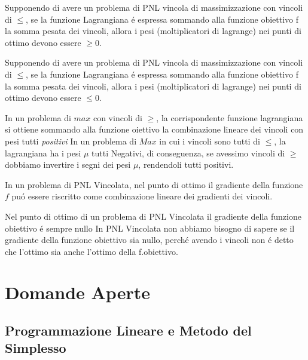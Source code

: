 \documentclass[12pt, a4paper, openany]{book}
\begin{document}
\affermazionetrue
{Supponendo di avere un problema di PNL vincola di massimizzazione con vincoli di $\leq$, se la funzione Lagrangiana é espressa sommando alla funzione obiettivo f la somma pesata dei vincoli, allora i pesi (moltiplicatori di lagrange) nei punti di ottimo devono essere $\geq 0$.}

\affermazionefalse
{Supponendo di avere un problema di PNL vincola di massimizzazione con vincoli di $\leq$, se la funzione Lagrangiana é espressa sommando alla funzione obiettivo f la somma pesata dei vincoli, allora i pesi (moltiplicatori di lagrange) nei punti di ottimo devono essere $\leq 0$.}

\affermazionetrue
{In un problema di $max$ con vincoli di $\geq$, la corrispondente funzione lagrangiana si ottiene sommando alla funzione oiettivo la combinazione lineare dei vincoli con pesi tutti \emph{positivi}}
{In un problema di $Max$ in cui i vincoli sono tutti di $\leq$, la lagrangiana ha i pesi $\mu$ tutti Negativi, di conseguenza, se avessimo vincoli di $\geq$ dobbiamo invertire i segni dei pesi $\mu$, rendendoli tutti positivi.}

\affermazionetrue
{In un problema di PNL Vincolata, nel punto di ottimo il gradiente della funzione $f$ puó essere riscritto come combinazione lineare dei gradienti dei vincoli.}

\affermazionefalse
{Nel punto di ottimo di un problema di PNL Vincolata il gradiente della funzione obiettivo é sempre nullo}
{In PNL Vincolata non abbiamo bisogno di sapere se il gradiente della funzione obiettivo sia nullo, perché avendo i vincoli non é detto che l'ottimo sia anche l'ottimo della f.obiettivo.}

\chapter{Domande Aperte}

\section{Programmazione Lineare e Metodo del Simplesso}
\end{document}
